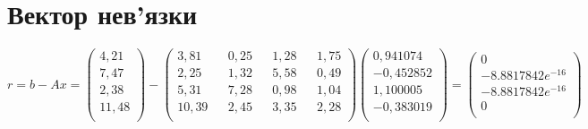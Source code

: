 \documentclass{report}
\begin{document}
\section*{Вектор нев’язки}
$r = b - Ax = 
\begin{pmatrix}
4,21\\
7,47\\
2,38\\
11,48\\
\end{pmatrix} - \begin{pmatrix}
3,81 && 0,25 && 1,28 && 1,75\\
2,25 && 1,32 && 5,58 && 0,49\\
5,31 && 7,28 && 0,98 && 1,04\\
10,39 && 2,45 && 3,35 && 2,28\\
\end{pmatrix}\begin{pmatrix}
0,941074\\
-0,452852\\
1,100005\\
-0,383019\\
\end{pmatrix} = \begin{pmatrix}
0\\
-8.8817842e^{-16}\\
-8.8817842e^{-16}\\
0\\
\end{pmatrix}$
\end{document}
